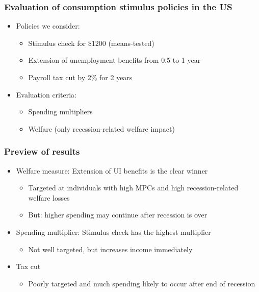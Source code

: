 \documentclass[pdflatex,aspectratio=169]{beamer}
\begin{document}
\begin{frame}
\frametitle{Evaluation of consumption stimulus policies in the US}
\begin{itemize}
\itemsep = .5\bigskipamount 
\item Policies we consider: 
\begin{itemize}
	\itemsep = .25\bigskipamount 
	\item Stimulus check for \$1200 (means-tested)
	\item Extension of unemployment benefits from 0.5 to 1 year
	\item Payroll tax cut by 2\% for 2 years
\end{itemize}
\bigskip
\item Evaluation criteria: 
\begin{itemize}
	\itemsep = .25\bigskipamount 
	\item Spending multipliers
	\item Welfare (only recession-related welfare impact)
\end{itemize}
\end{itemize}
\end{frame}


\begin{frame}
\frametitle{Preview of results}
\begin{itemize}
\itemsep = \bigskipamount 
\item Welfare measure: Extension of UI benefits is the clear winner 
\begin{itemize}
\itemsep = .25\bigskipamount 
\item Targeted at individuals with high MPCs and high recession-related welfare losses
\item But: higher spending may continue after recession is over 
\end{itemize}
\item Spending multiplier: Stimulus check has the highest multiplier 
\begin{itemize}
\itemsep = .25\bigskipamount 
\item Not well targeted, but increases income immediately 
\end{itemize}
\item Tax cut
\begin{itemize}
	\itemsep = .25\bigskipamount 
	\item Poorly targeted and much spending likely to occur after end of recession
\end{itemize}
\end{itemize}
\end{frame}
\end{document}
